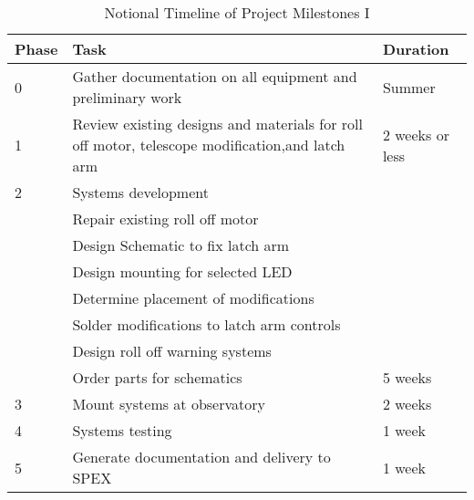 \documentclass[conference]{IEEEtran} %
\begin{document}
\begin{table}[hb!]
      \caption{Notional Timeline of Project Milestones I}
      \centering
      \begin{tabularx}{\linewidth}{lXl}
          \toprule %
          Phase & Task & Duration \\
          \midrule %
          0 & Gather documentation on all equipment and preliminary work & Summer \\
          1 & Review existing designs and materials for roll off motor, telescope modification,and latch arm & 2 weeks or less \\
          2 & Systems development \\
          & Repair existing roll off motor \\
          & Design Schematic to fix latch arm \\
          & Design mounting for selected LED \\
          & Determine placement of modifications \\
          & Solder modifications to latch arm controls \\
          & Design roll off warning systems \\
          & Order parts for schematics & 5 weeks \\
          3 & Mount systems at observatory & 2 weeks \\
          4 & Systems testing & 1 week \\
          5 & Generate documentation and delivery to SPEX & 1 week \\
          \bottomrule
      \end{tabularx}
  \label{tab:timeline1}
  \end{table}
\end{document}
